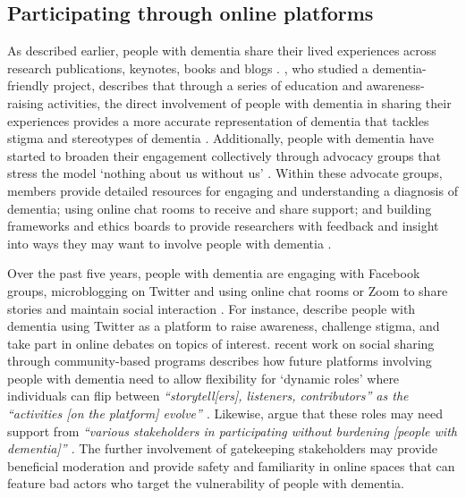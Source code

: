 \subsection{Participating through online platforms}
\label{PD:onlinePlatform}
As described earlier, people with dementia share their lived experiences across research publications, keynotes, books and blogs \citep{bryden_challenging_2020, shakespeare_rights_2019}. \cite{phillipson2019involvement}, who studied a dementia-friendly project, describes that through a series of education and awareness-raising activities, the direct involvement of people with dementia in sharing their experiences provides a more accurate representation of dementia that tackles stigma and stereotypes of dementia \citep{herrmann_systematic_2018}. Additionally, people with dementia have started to broaden their engagement collectively through advocacy groups that stress the model `nothing about us without us' \citep{oldfield2021nothing}. Within these advocate groups, members provide detailed resources for engaging and understanding a diagnosis of dementia; using online chat rooms to receive and share support; and building frameworks and ethics boards to provide researchers with feedback and insight into ways they may want to involve people with dementia \citep{davies2021dementia}.

Over the past five years, people with dementia are engaging with Facebook groups, microblogging on Twitter and using online chat rooms or Zoom to share stories and maintain social interaction \citep{lazar_safe_2019}. For instance, \cite{talbot_how_2020} describe people with dementia using Twitter as a platform to raise awareness, challenge stigma, and take part in online debates on topics of interest. \cite{dai2020making} recent work on social sharing through community-based programs describes how future platforms involving people with dementia need to allow flexibility for `dynamic roles' where individuals can flip between \textit{``storytell[ers], listeners, contributors'' as the ``activities [on the platform] evolve'' \citep[pg. 10]{dai2020making}}. Likewise, \cite{johnson2020roles} argue that these roles may need support from \textit{``various stakeholders in participating without burdening [people with dementia]'' \citep[pg. 127]{johnson2020roles}}. The further involvement of gatekeeping stakeholders may provide beneficial moderation and provide safety and familiarity in online spaces that can feature bad actors who target the vulnerability of people with dementia. 

